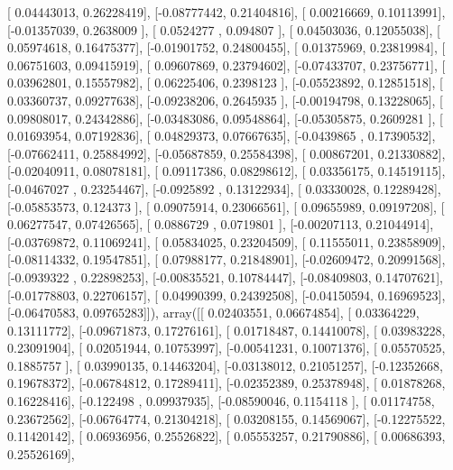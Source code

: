 \documentclass{article}
\begin{document}
       [ 0.04443013,  0.26228419],
       [-0.08777442,  0.21404816],
       [ 0.00216669,  0.10113991],
       [-0.01357039,  0.2638009 ],
       [ 0.0524277 ,  0.094807  ],
       [ 0.04503036,  0.12055038],
       [ 0.05974618,  0.16475377],
       [-0.01901752,  0.24800455],
       [ 0.01375969,  0.23819984],
       [ 0.06751603,  0.09415919],
       [ 0.09607869,  0.23794602],
       [-0.07433707,  0.23756771],
       [ 0.03962801,  0.15557982],
       [ 0.06225406,  0.2398123 ],
       [-0.05523892,  0.12851518],
       [ 0.03360737,  0.09277638],
       [-0.09238206,  0.2645935 ],
       [-0.00194798,  0.13228065],
       [ 0.09808017,  0.24342886],
       [-0.03483086,  0.09548864],
       [-0.05305875,  0.2609281 ],
       [ 0.01693954,  0.07192836],
       [ 0.04829373,  0.07667635],
       [-0.0439865 ,  0.17390532],
       [-0.07662411,  0.25884992],
       [-0.05687859,  0.25584398],
       [ 0.00867201,  0.21330882],
       [-0.02040911,  0.08078181],
       [ 0.09117386,  0.08298612],
       [ 0.03356175,  0.14519115],
       [-0.0467027 ,  0.23254467],
       [-0.0925892 ,  0.13122934],
       [ 0.03330028,  0.12289428],
       [-0.05853573,  0.124373  ],
       [ 0.09075914,  0.23066561],
       [ 0.09655989,  0.09197208],
       [ 0.06277547,  0.07426565],
       [ 0.0886729 ,  0.0719801 ],
       [-0.00207113,  0.21044914],
       [-0.03769872,  0.11069241],
       [ 0.05834025,  0.23204509],
       [ 0.11555011,  0.23858909],
       [-0.08114332,  0.19547851],
       [ 0.07988177,  0.21848901],
       [-0.02609472,  0.20991568],
       [-0.0939322 ,  0.22898253],
       [-0.00835521,  0.10784447],
       [-0.08409803,  0.14707621],
       [-0.01778803,  0.22706157],
       [ 0.04990399,  0.24392508],
       [-0.04150594,  0.16969523],
       [-0.06470583,  0.09765283]]), array([[ 0.02403551,  0.06674854],
       [ 0.03364229,  0.13111772],
       [-0.09671873,  0.17276161],
       [ 0.01718487,  0.14410078],
       [ 0.03983228,  0.23091904],
       [ 0.02051944,  0.10753997],
       [-0.00541231,  0.10071376],
       [ 0.05570525,  0.1885757 ],
       [ 0.03990135,  0.14463204],
       [-0.03138012,  0.21051257],
       [-0.12352668,  0.19678372],
       [-0.06784812,  0.17289411],
       [-0.02352389,  0.25378948],
       [ 0.01878268,  0.16228416],
       [-0.122498  ,  0.09937935],
       [-0.08590046,  0.1154118 ],
       [ 0.01174758,  0.23672562],
       [-0.06764774,  0.21304218],
       [ 0.03208155,  0.14569067],
       [-0.12275522,  0.11420142],
       [ 0.06936956,  0.25526822],
       [ 0.05553257,  0.21790886],
       [ 0.00686393,  0.25526169],
\end{document}
